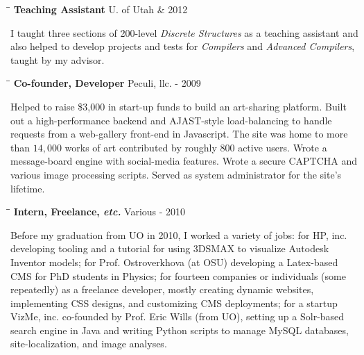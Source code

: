 \documentclass[line]{res}
\begin{document}
\begin{resume}
   \vspace{-0.2cm}  
   \begin{tabbing}
    \hspace{2.25in}\= \hspace{2.25in}\= \kill %
    {\bf Teaching Assistant} \>U. of Utah      \& 2012
   \end{tabbing}\vspace{-0.5cm}      %
    I taught three sections of 200-level \textit{Discrete Structures} as a teaching assistant and also helped to develop projects and tests for \textit{Compilers} and \textit{Advanced Compilers}, taught by my advisor.
   \vspace{-0.2cm}  
   \begin{tabbing}
    \hspace{2.25in}\= \hspace{2.25in}\= \kill %
    {\bf Co-founder, Developer} \>Peculi, llc.     - 2009
   \end{tabbing}\vspace{-0.5cm}      %
   Helped to raise \$3,000 in start-up funds to build an art-sharing platform. Built out a high-performance backend and AJAST-style
   load-balancing to handle requests from a web-gallery front-end in Javascript. The site was home to more than $14,000$ works of art contributed
   by roughly $800$ active users. Wrote a message-board engine with social-media features. Wrote a secure CAPTCHA and various image processing
   scripts. Served as system administrator for the site's lifetime.
   \vspace{-0.2cm}  
   \begin{tabbing}
    \hspace{2.25in}\= \hspace{2.25in}\= \kill %
    {\bf Intern, Freelance, \textit{etc.}} \>Various      - 2010
   \end{tabbing}\vspace{-0.5cm}      %
   Before my graduation from UO in 2010, I worked a variety of jobs: for HP, inc. developing tooling and a tutorial for using 3DSMAX to visualize Autodesk Inventor models; for Prof. Ostroverkhova (at OSU) developing a Latex-based CMS for PhD students in Physics; for fourteen companies or individuals (some repeatedly) as a freelance developer, mostly creating dynamic websites, implementing CSS designs, and customizing CMS deployments; for a startup VizMe, inc. co-founded by Prof. Eric Wills (from UO), setting up a Solr-based search engine in Java and writing Python scripts to manage MySQL databases, site-localization, and image analyses.


\end{resume}
\end{document}
